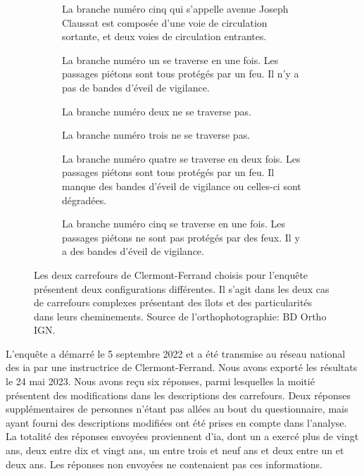 \begin{figure}
\begin{subfigure}[t]{\linewidth}
\begin{minipage}[t]{0.49\linewidth}
            La branche numéro cinq qui s'appelle avenue Joseph Claussat est composée d'une voie de circulation sortante, et deux voies de circulation entrantes.

            \vspace{5pt}

            La branche numéro un se traverse en une fois. Les passages piétons sont tous protégés par un feu. Il n'y a pas de bandes d'éveil de vigilance.

            \vspace{5pt}

            La branche numéro deux ne se traverse pas.

            \vspace{5pt}

            La branche numéro trois ne se traverse pas.

            \vspace{5pt}

            La branche numéro quatre se traverse en deux fois. Les passages piétons sont tous protégés par un feu. Il manque des bandes d'éveil de vigilance ou celles-ci sont dégradées.

            \vspace{5pt}
            
            La branche numéro cinq se traverse en une fois. Les passages piétons ne sont pas protégés par des feux. Il y a des bandes d'éveil de vigilance.
        \end{minipage}
    \end{subfigure}
    \caption[Carrefours choisis pour l'enquête auprès des instructeurs]{Les deux carrefours de Clermont-Ferrand choisis pour l'enquête présentent deux configurations différentes. Il s'agit dans les deux cas de carrefours complexes présentant des îlots et des particularités dans leurs cheminements. Source de l'orthophotographie: BD Ortho IGN.}
    \label{fig:evaluation_carrefours_enquete}
\end{figure}

\newpar{}

L'enquête a démarré le 5 septembre 2022 et a été transmise au réseau national des \gls{ia} par une instructrice de Clermont-Ferrand. Nous avons exporté les résultats le 24 mai 2023. Nous avons reçu six réponses, parmi lesquelles la moitié présentent des modifications dans les descriptions des carrefours. Deux réponses supplémentaires de personnes n'étant pas allées au bout du questionnaire, mais ayant fourni des descriptions modifiées ont été prises en compte dans l'analyse. La totalité des réponses envoyées proviennent d'\gls{ia}, dont un a exercé plus de vingt ans, deux entre dix et vingt ans, un entre trois et neuf ans et deux entre un et deux ans. Les réponses non envoyées ne contenaient pas ces informations.

